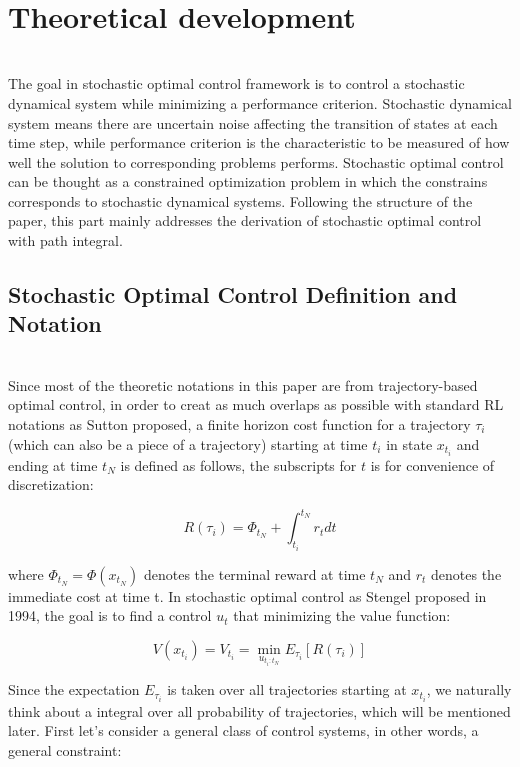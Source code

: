 \documentclass[journal]{IEEEtran}
\begin{document}
\ \\
\section{Theoretical development}
\ \\
The goal in stochastic optimal control framework is to control a stochastic dynamical system while
minimizing a performance criterion. Stochastic dynamical system means there are uncertain noise affecting the transition of states at each time step, 
while performance criterion is the characteristic to be measured of how well the solution to corresponding problems performs.
Stochastic optimal control can be thought as a constrained optimization problem in which the constrains corresponds to stochastic dynamical systems.
Following the structure of the paper, this part mainly addresses the derivation of stochastic optimal control with path integral.
\ \\

\subsection{Stochastic Optimal Control Definition and Notation}
\ \\
Since most of the theoretic notations in this paper are from trajectory-based optimal control, in order to creat as much overlaps as possible with
standard RL notations as Sutton proposed, a finite horizon cost function for a trajectory $\tau_i$(which can also be a piece of a trajectory) 
starting at time $t_i$ in state $x_{t_i}$ and ending at time $t_N$ is defined as follows, the subscripts for $t$ is for convenience of discretization:

\begin{equation}
  R(\tau_i)=\Phi_{t_N} + \int_{t_i}^{t_N}r_t dt
  \label{cost}
\end{equation}

where $\Phi_{t_N} = \Phi(x_{t_N})$ denotes the terminal reward at time $t_N$ and $r_t$ denotes the immediate cost at time t. In stochastic optimal control
as Stengel proposed in 1994, the goal is to find a control $u_t$ that minimizing the value function:

\begin{equation}
  V(x_{t_i})=V_{t_i} = \min_{u_{t_i:t_N}} E_{\tau_i} [R(\tau_i)]
  \label{valuefunc}
\end{equation}

Since the expectation $E_{\tau_i}$ is taken over all trajectories starting at $x_{t_i}$, we naturally think about a integral over all probability of trajectories,
which will be mentioned later.
First let's consider a general class of control systems, in other words, a general constraint:
\end{document}
